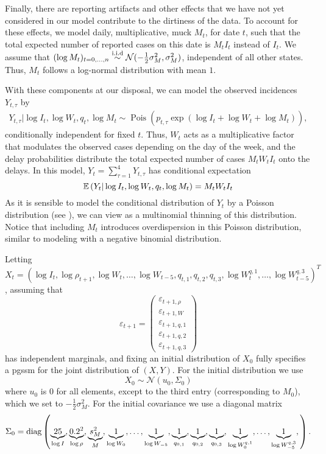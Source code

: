 Finally, there are reporting artifacts and other effects that we have not yet considered in our model contribute to the dirtiness of the data. To account for these effects, we model daily, multiplicative, \glqq{}muck\grqq{} $M_{t}$, for date $t$, such that the total expected number of reported cases on this date is $M_{t}I_{t}$ instead of $I_{t}$. We assume that $(\log M_{t})_{t = 0, \dots, n} \stackrel{\text{i.i.d}}{\sim} \mathcal N(-\frac{1}{2}\sigma^{2}_M, \sigma^{2}_{M})$, independent of all other states. Thus, $M_{t}$ follows a log-normal distribution with mean $1$. 

With these components at our disposal, we can model the observed incidences $Y_{t, \tau}$ by
\begin{align}
    \label{eq:reporting_delays_Y}
    Y_{t, \tau} | \log I_{t}, \log W_{t}, q_{t}, \log M_{t} \sim \operatorname{Pois} \left( p_{t, \tau}\exp \left(\log I_{t} + \log W_{t}  + \log M_{t}\right) \right),
\end{align}
conditionally independent for fixed $t$. Thus, $W_{t}$ acts as a multiplicative factor that modulates the observed cases depending on the day of the week, and the delay probabilities distribute the total expected number of cases $M_{t}W_{t}I_{t}$ onto the delays. In this model, $Y_{t} = \sum_{\tau = 1}^4 Y_{t, \tau}$ has conditional expectation 
$$
    \mathbb E \left( Y_{t} | \log I_{t}, \log W_{t}, q_{t}, \log M_{t} \right) = M_{t}W_{t}I_t
$$
As it is sensible to model the conditional distribution of $Y_{t}$ by a Poisson distribution (see ), we can view  as a multinomial thinning of this distribution. Notice that including $M_{t}$ introduces overdispersion in this Poisson distribution, similar to modeling with a negative binomial distribution. 

Letting $X_{t} =\left( \log I_{t}, \log \rho_{t + 1}, \log W_{t}, \dots, \log W_{t - 5}, q_{t,1}, q_{t,2}, q_{t,3}, \log W^{q,1}_{t}, \dots, \log W^{q,3}_{t - 5}\right)^{T}$, assuming that
$$
\varepsilon_{t + 1} = 
\begin{pmatrix}
     \varepsilon_{t + 1,\rho}\\ \varepsilon_{t + 1, W}\\ \varepsilon_{t +1, q, 1}\\ \varepsilon_{t +1, q, 2}\\ \varepsilon_{t +1, q, 3}
\end{pmatrix}
$$
has independent marginals, and fixing an initial distribution of $X_{0}$ fully specifies a \acrshort{pgssm} for the joint distribution of $(X,Y)$. For the initial distribution we use 
$$
    X_{0} \sim \mathcal N \left( u_{0}, \Sigma_{0} \right)
$$
where $u_{0}$ is $0$ for all elements, except to the third entry (corresponding to $M_{0}$), which we set to $-\frac{1}{2} \sigma^{2}_M$. For the initial covariance we use a diagonal matrix 
$$
    \Sigma_{0} = \operatorname{diag} \left( 
        \underbrace{25}_{\log I},
        \underbrace{0.2^{2}}_{\log \rho},
        \underbrace{s^{2}_M}_{M},
        \underbrace{1}_{\log W_{0}},
        \dots,
        \underbrace{1}_{\log W_{-5}},
        \underbrace{1}_{q_{0, 1}},
        \underbrace{1}_{q_{0, 2}},
        \underbrace{1}_{q_{0, 3}},
        \underbrace{1}_{\log W^{q,1}_{0}},
        \dots,
        \underbrace{1}_{\log W^{q,3}_{-5}},
    \right).
$$

